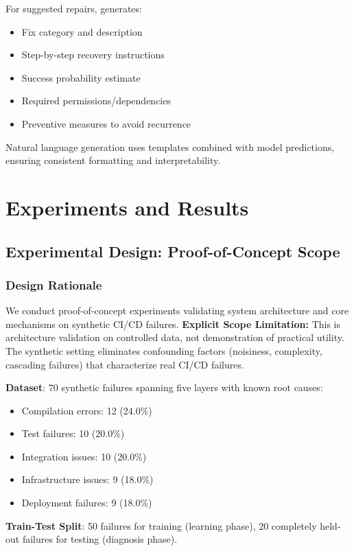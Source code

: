 \documentclass[11pt]{article}
\begin{document}
For suggested repairs, generates:
\begin{itemize}
    \item Fix category and description
    \item Step-by-step recovery instructions
    \item Success probability estimate
    \item Required permissions/dependencies
    \item Preventive measures to avoid recurrence
\end{itemize}

Natural language generation uses templates combined with model predictions, ensuring consistent formatting and interpretability.

\section{Experiments and Results}

\subsection{Experimental Design: Proof-of-Concept Scope}

\subsubsection{Design Rationale}

We conduct proof-of-concept experiments validating system architecture and core mechanisms on synthetic CI/CD failures. \textbf{Explicit Scope Limitation:} This is architecture validation on controlled data, not demonstration of practical utility. The synthetic setting eliminates confounding factors (noisiness, complexity, cascading failures) that characterize real CI/CD failures.

\textbf{Dataset}: 70 synthetic failures spanning five layers with known root causes:
\begin{itemize}
    \item Compilation errors: 12 (24.0\%)
    \item Test failures: 10 (20.0\%)
    \item Integration issues: 10 (20.0\%)
    \item Infrastructure issues: 9 (18.0\%)
    \item Deployment failures: 9 (18.0\%)
\end{itemize}

\textbf{Train-Test Split}: 50 failures for training (learning phase), 20 completely held-out failures for testing (diagnosis phase).
\end{document}
